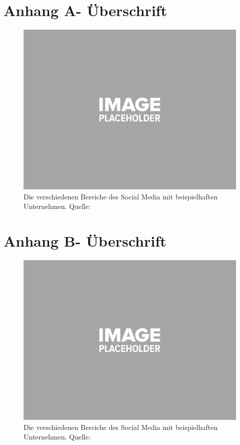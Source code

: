 \appendix
{}
\label{ch:Anhang}
\pagebreak

\section{Anhang A- Überschrift}

\begin{figure}[H]
	\centering
	\includegraphics[width=\textwidth]{_img/placeholder_image.png}
	\caption[Social Media Kreislauf und Unternehmen]{Die verschiedenen Bereiche des Social Media mit beispielhaften Unternehmen. Quelle: \cite{wsocialm}}
	\label{fig:social_media}
\end{figure}

\section{Anhang B- Überschrift}

\begin{figure}[H]
	\centering
	\includegraphics[width=\textwidth]{_img/placeholder_image.png}
	\caption[Social Media Kreislauf und Unternehmen]{Die verschiedenen Bereiche des Social Media mit beispielhaften Unternehmen. Quelle: \cite{wsocialm}}
	\label{fig:social_media}
\end{figure}

